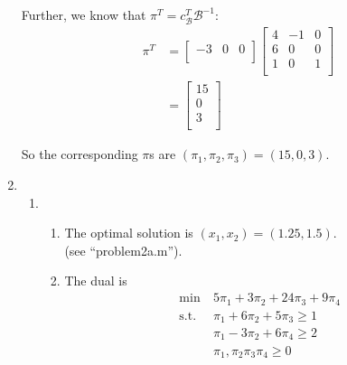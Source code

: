 \documentclass[12pt]{article}
\begin{document}
\begin{enumerate}
    Further, we know that $\pi^T=c^T_\mathcal{B}\mathcal{B}^{-1}$:\\
    \begin{equation}
      \begin{split}
        \pi^T&=
          \begin{bmatrix*}-3 & 0 & 0 \\\end{bmatrix*}
          \begin{bmatrix*}
            4 & -1 & 0 \\
            6 & 0 & 0 \\
            1 & 0 & 1 \\
          \end{bmatrix*} \\
        &=
          \begin{bmatrix*}
            15 \\
            0 \\
            3 \\
          \end{bmatrix*}
      \end{split}
    \end{equation}

    So the corresponding $\pi$s are $(\pi_1,\pi_2,\pi_3)=(15,0,3)$.\\
  \item
    \begin{enumerate}
      \item
        \begin{enumerate}
          \item
            The optimal solution is $(x_1,x_2)=(1.25,1.5)$.\\
            (see ``problem2a.m'').\\
          \item
            The dual is
            \begin{equation}
              \begin{split}
                \text{min}\ &5\pi_1+3\pi_2+24\pi_3+9\pi_4\\
                \text{s.t.}\ &\pi_1+6\pi_2+5\pi_3\geq1\\
                &\pi_1-3\pi_2+6\pi_4\geq 2\\
                &\pi_1,\pi_2\pi_3\pi_4\geq0\\
              \end{split}
            \end{equation}


\end{enumerate}
\end{enumerate}
\end{enumerate}
\end{document}
